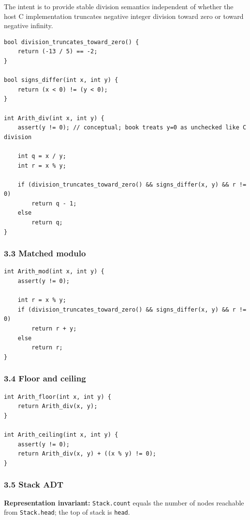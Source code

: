 \documentclass[11pt]{article}
\begin{document}
The intent is to provide stable division semantics independent of whether the host C implementation truncates negative integer division toward zero or toward negative infinity.

\begin{verbatim}
bool division_truncates_toward_zero() {
    return (-13 / 5) == -2;
}

bool signs_differ(int x, int y) {
    return (x < 0) != (y < 0);
}

int Arith_div(int x, int y) {
    assert(y != 0); // conceptual; book treats y=0 as unchecked like C division

    int q = x / y;
    int r = x % y;

    if (division_truncates_toward_zero() && signs_differ(x, y) && r != 0)
        return q - 1;
    else
        return q;
}
\end{verbatim}

\subsubsection{3.3 Matched modulo}\label{matched-modulo}

\begin{verbatim}
int Arith_mod(int x, int y) {
    assert(y != 0);

    int r = x % y;
    if (division_truncates_toward_zero() && signs_differ(x, y) && r != 0)
        return r + y;
    else
        return r;
}
\end{verbatim}

\subsubsection{3.4 Floor and ceiling}\label{floor-and-ceiling}

\begin{verbatim}
int Arith_floor(int x, int y) {
    return Arith_div(x, y);
}

int Arith_ceiling(int x, int y) {
    assert(y != 0);
    return Arith_div(x, y) + ((x % y) != 0);
}
\end{verbatim}

\subsubsection{3.5 Stack ADT}\label{stack-adt}

\textbf{Representation invariant:} \texttt{Stack.count} equals the number of nodes reachable from \texttt{Stack.head}; the top of stack is \texttt{head}.
\end{document}
